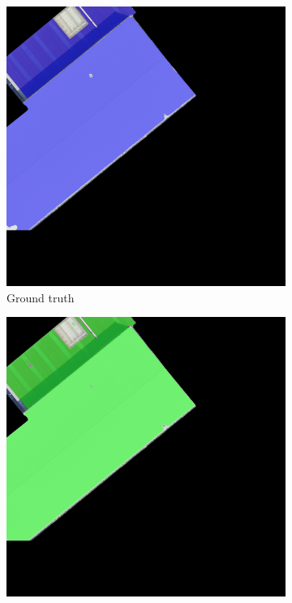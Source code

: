 \begin{figure}[htbp]
\begin{subfigure}{0.32\textwidth}
        \includegraphics[width=\textwidth]{02-main//figures/ch4/kfold_ensembles/linknet_timm-efficientnet-b5/best_cases/best_3_iou0.986_24931117_tile_18_5_f475a0_overlay_gt.png}
        \caption{Ground truth}
    \end{subfigure}
    \hfill
    \begin{subfigure}{0.32\textwidth}
        \includegraphics[width=\textwidth]{02-main//figures/ch4/kfold_ensembles/linknet_timm-efficientnet-b5/best_cases/best_3_iou0.986_24931117_tile_18_5_f475a0_overlay_pred.png}

\end{subfigure}
\end{figure}

